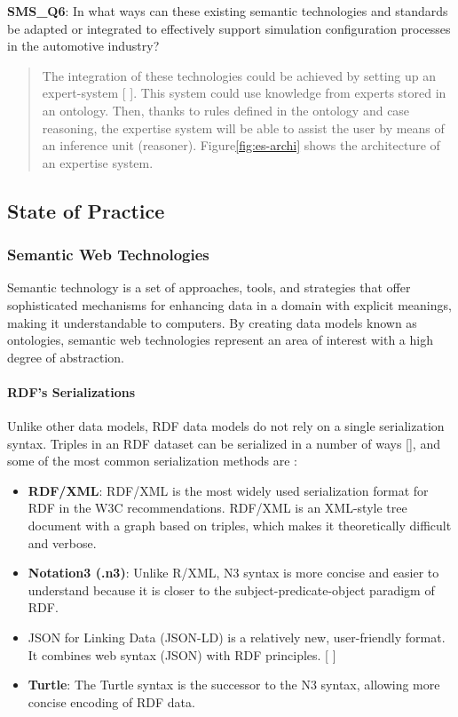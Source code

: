             \textbf{SMS\_Q6}: In what ways can these existing semantic technologies and standards be adapted or integrated to effectively support simulation configuration processes in the automotive industry?
            \begin{quote}
                The integration of these technologies could be achieved by setting up an expert-system [ ]. This system could use knowledge from experts stored in an ontology. Then, thanks to rules defined in the ontology and case reasoning, the expertise system will be able to assist the user by means of an inference unit (reasoner).  Figure\ref{fig:es-archi} shows the architecture of an expertise system.\\
            \end{quote}
        
    \subsection{State of Practice}
        \subsubsection{Semantic Web Technologies\label{sec:semtec}}
        Semantic technology is a set of approaches, tools, and strategies that offer sophisticated mechanisms for enhancing data in a domain with explicit meanings, making it understandable to computers. By creating data models known as ontologies, semantic web technologies represent an area of interest with a high degree of abstraction.\\ 
        
            \paragraph{RDF's Serializations}
                Unlike other data models, RDF data models do not rely on a single serialization syntax. Triples in an RDF dataset can be serialized in a number of ways [], and some of the most common serialization methods are : 

                \begin{itemize}
                    \item \textbf{RDF/XML}: RDF/XML is the most widely used serialization format for RDF in the W3C recommendations. RDF/XML is an XML-style tree document with a graph based on triples, which makes it theoretically difficult and verbose. 
                    \item \textbf{Notation3 (.n3)}: Unlike R/XML, N3 syntax is more concise and easier to understand because it is closer to the subject-predicate-object paradigm of RDF. 
                    \item JSON for Linking Data (JSON-LD) is a relatively new, user-friendly format. It combines web syntax (JSON) with RDF principles. [ ] 
                    \item \textbf{Turtle}: The Turtle syntax is the successor to the N3 syntax, allowing more concise encoding of RDF data.
                \end{itemize}

